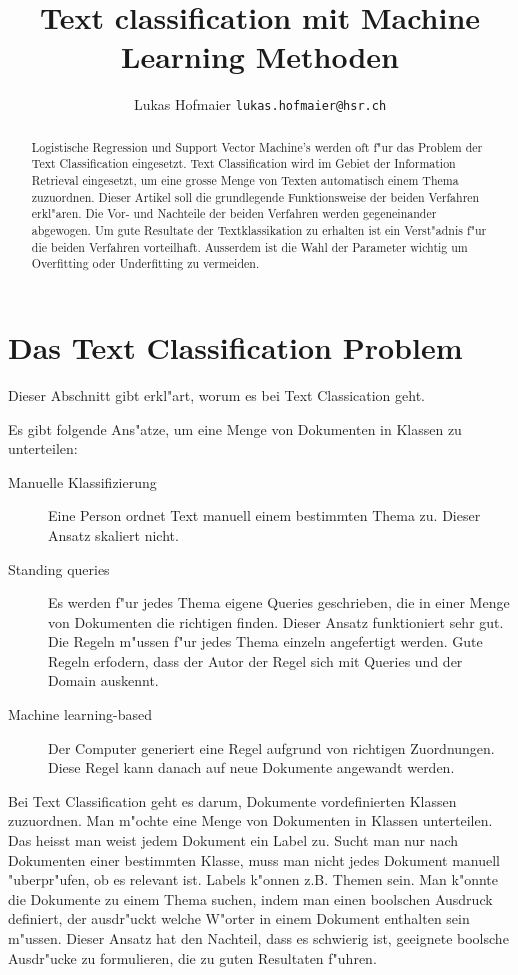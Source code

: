 \documentclass[12pt,a4paper,twoside]{article}
\begin{document}
\lstset{
basicstyle=\small\ttfamily,
xleftmargin=3.5em,
language=Promela,
captionpos=b
}

\title{Text classification mit Machine Learning Methoden}
\author{Lukas Hofmaier \texttt{lukas.hofmaier@hsr.ch}}
\maketitle

\begin{abstract}
Logistische Regression und Support Vector Machine's werden oft f"ur das Problem der Text Classification eingesetzt. Text Classification wird im Gebiet der Information Retrieval eingesetzt, um eine grosse Menge von Texten automatisch einem Thema zuzuordnen.  Dieser Artikel soll die grundlegende Funktionsweise der beiden Verfahren erkl"aren. Die Vor- und Nachteile der beiden Verfahren werden gegeneinander abgewogen. Um gute Resultate der Textklassikation zu erhalten ist ein Verst"adnis f"ur die beiden Verfahren vorteilhaft. Ausserdem ist die Wahl der Parameter wichtig um Overfitting oder Underfitting zu vermeiden.
\end{abstract}

\section{Das Text Classification Problem}
\label{sec:problem}

Dieser Abschnitt gibt erkl"art, worum es bei Text Classication geht.

Es gibt folgende Ans"atze, um eine Menge von Dokumenten in Klassen zu unterteilen:
\begin{description}
\item[Manuelle Klassifizierung] Eine Person ordnet Text manuell einem bestimmten Thema zu. Dieser Ansatz skaliert nicht.
\item[Standing queries] Es werden f"ur jedes Thema eigene Queries geschrieben, die in einer Menge von Dokumenten die richtigen finden. Dieser Ansatz funktioniert sehr gut. Die Regeln m"ussen f"ur jedes Thema einzeln angefertigt werden. Gute Regeln erfodern, dass der Autor der Regel sich mit Queries und der Domain auskennt.
\item[Machine learning-based] Der Computer generiert eine Regel aufgrund von richtigen Zuordnungen. Diese Regel kann danach auf neue Dokumente angewandt werden.
\end{description}


Bei Text Classification geht es darum, Dokumente vordefinierten Klassen zuzuordnen. Man m"ochte eine Menge von Dokumenten in Klassen unterteilen. Das heisst man weist jedem Dokument ein Label zu. Sucht man nur nach Dokumenten einer bestimmten Klasse, muss man nicht jedes Dokument manuell "uberpr"ufen, ob es relevant ist. Labels k"onnen z.B. Themen sein. Man k"onnte die Dokumente zu einem Thema suchen, indem man einen boolschen Ausdruck definiert, der ausdr"uckt welche W"orter in einem Dokument enthalten sein m"ussen. Dieser Ansatz hat den Nachteil, dass es schwierig ist, geeignete boolsche Ausdr"ucke zu formulieren, die zu guten Resultaten f"uhren.
\end{document}
